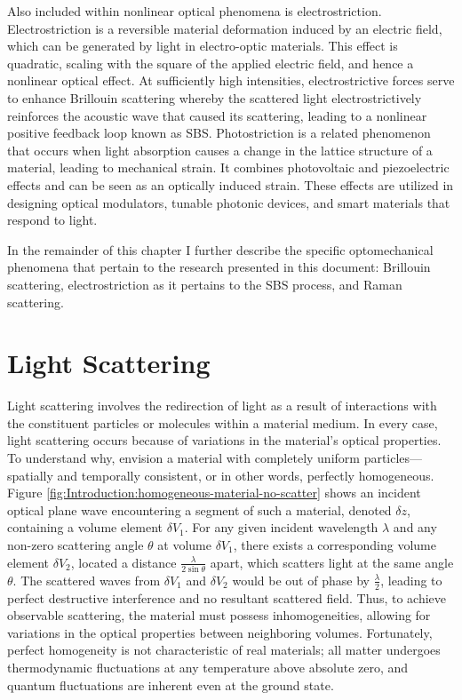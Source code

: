 Also included within nonlinear optical phenomena is electrostriction. Electrostriction is a reversible material deformation induced by an electric field, which can be generated by light in electro-optic materials. This effect is quadratic, scaling with the square of the applied electric field, and hence a nonlinear optical effect. At sufficiently high intensities, electrostrictive forces serve to enhance Brillouin scattering whereby the scattered light electrostrictively reinforces the acoustic wave that caused its scattering, leading to a nonlinear positive feedback loop known as \ac{SBS}. Photostriction is a related phenomenon that occurs when light absorption causes a change in the lattice structure of a material, leading to mechanical strain. It combines photovoltaic and piezoelectric effects and can be seen as an optically induced strain. These effects are utilized in designing optical modulators\cite{}, tunable photonic devices\cite{}, and smart materials that respond to light\cite{}.

In the remainder of this chapter I further describe the specific optomechanical phenomena that pertain to the research presented in this document: Brillouin scattering, electrostriction as it pertains to the \ac{SBS} process, and Raman scattering.


\section{Light Scattering}
\label{Introduction:sec:LightScattering}
Light scattering involves the redirection of light as a result of interactions with the constituent particles or molecules within a material medium. In every case, light scattering occurs because of variations in the material's optical properties. To understand why, envision a material with completely uniform particles---spatially and temporally consistent, or in other words, perfectly homogeneous. Figure \ref{fig:Introduction:homogeneous-material-no-scatter} shows an incident optical plane wave encountering a segment of such a material, denoted $\delta z$, containing a volume element $\delta V_{1}$. For any given incident wavelength $\lambda$ and any non-zero scattering angle $\theta$ at volume $\delta V_{1}$, there exists a corresponding volume element $\delta V_{2}$, located a distance $\frac{\lambda}{2\sin\theta}$ apart, which scatters light at the same angle $\theta$. The scattered waves from $\delta V_{1}$ and $\delta V_{2}$ would be out of phase by $\frac{\lambda}{2}$, leading to perfect destructive interference and no resultant scattered field. Thus, to achieve observable scattering, the material must possess inhomogeneities, allowing for variations in the optical properties between neighboring volumes. Fortunately, perfect homogeneity is not characteristic of real materials; all matter undergoes thermodynamic fluctuations at any temperature above absolute zero, and quantum fluctuations are inherent even at the ground state.

